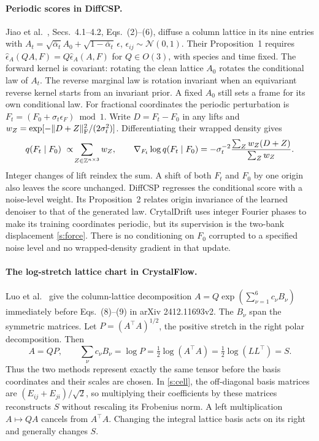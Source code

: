 \paragraph{Periodic scores in DiffCSP.}
Jiao et al.\ \cite{diffcsp}, Secs.~4.1--4.2, Eqs.~(2)--(6), diffuse a column lattice in its nine entries with $A_t=\sqrt{\bar\alpha_t}A_0+\sqrt{1-\bar\alpha_t}\,\epsilon$, $\epsilon_{ij}\sim\mathcal N(0,1)$. Their Proposition~1 requires $\hat\epsilon_A(QA,F)=Q\hat\epsilon_A(A,F)$ for $Q\in O(3)$, with species and time fixed. The forward kernel is covariant: rotating the clean lattice $A_0$ rotates the conditional law of $A_t$. The reverse marginal law is rotation invariant when an equivariant reverse kernel starts from an invariant prior. A fixed $A_0$ still sets a frame for its own conditional law. For fractional coordinates the periodic perturbation is $F_t=(F_0+\sigma_t\epsilon_F)\bmod1$. Write $D=F_t-F_0$ in any lifts and $w_Z=\exp[-\|D+Z\|_{\rm F}^2/(2\sigma_t^2)]$. Differentiating their wrapped density gives
\begin{equation}
 q(F_t\mid F_0)\ \propto\!\sum_{Z\in\zz^{n\times3}}w_Z,\qquad
 \nabla_{F_t}\log q(F_t\mid F_0)
 =-\sigma_t^{-2}\frac{\sum_Z w_Z(D+Z)}{\sum_Z w_Z}.
 \label{s:wrapped}
\end{equation}
Integer changes of lift reindex the sum. A shift of both $F_t$ and $F_0$ by one origin also leaves the score unchanged. DiffCSP regresses the conditional score with a noise-level weight. Its Proposition~2 relates origin invariance of the learned denoiser to that of the generated law. CrytalDrift uses integer Fourier phases to make its training coordinates periodic, but its supervision is the two-bank displacement \eqref{s:force}. There is no conditioning on $F_0$ corrupted to a specified noise level and no wrapped-density gradient in that update.

\paragraph{The log-stretch lattice chart in CrystalFlow.}
Luo et al.\ \cite{crystalflow} give the column-lattice decomposition $A=Q\exp(\sum_{\nu=1}^6 c_\nu B_\nu)$ immediately before Eqs.~(8)--(9) in arXiv 2412.11693v2. The $B_\nu$ span the symmetric matrices. Let $P=(A^\top A)^{1/2}$, the positive stretch in the right polar decomposition. Then
\[
 A=QP,\qquad \sum_\nu c_\nu B_\nu=\log P=\tfrac12\log(A^\top A)
 =\tfrac12\log(LL^\top)=S .
\]
Thus the two methods represent exactly the same tensor before the basis coordinates and their scales are chosen. In \eqref{s:cell}, the off-diagonal basis matrices are $(E_{ij}+E_{ji})/\sqrt2$, so multiplying their coefficients by these matrices reconstructs $S$ without rescaling its Frobenius norm. A left multiplication $A\mapsto QA$ cancels from $A^\top A$. Changing the integral lattice basis acts on its right and generally changes $S$.

